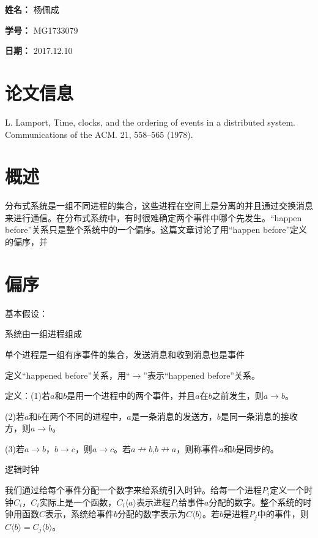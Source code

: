 \documentclass[UTF8]{article}
\begin{document}
    
{\flushleft \bf \Large 姓名：} 杨佩成

{\flushleft \bf \Large 学号：} MG1733079

{\flushleft \bf \Large 日期：} 2017.12.10


\section*{论文信息}
    
L. Lamport, Time, clocks, and the ordering of events in a distributed system. Communications of the ACM. 21, 558–565 (1978).


\section{概述}

	分布式系统是一组不同进程的集合，这些进程在空间上是分离的并且通过交换消息来进行通信。在分布式系统中，有时很难确定两个事件中哪个先发生。“happen before”关系只是整个系统中的一个偏序。这篇文章讨论了用“happen before”定义的偏序，并

\section{偏序}
  
	

	基本假设：
	
	系统由一组进程组成
	
	单个进程是一组有序事件的集合，发送消息和收到消息也是事件

	定义“happened before”关系，用“$\to$”表示“happened before”关系。

	定义：(1)若$a$和$b$是用一个进程中的两个事件，并且$a$在$b$之前发生，则$a \to b$。

		(2)若$a$和$b$在两个不同的进程中，$a$是一条消息的发送方，$b$是同一条消息的接收方，则$a \to b$。

		(3)若$a \to b$，$b \to c$，则$a \to c$。若$a \nrightarrow b$,$b \nrightarrow a$，则称事件$a$和$b$是同步的。

	逻辑时钟
	
	我们通过给每个事件分配一个数字来给系统引入时钟。给每一个进程$P_i$定义一个时钟$C_i$，$C_i$实际上是一个函数，$C_i \langle a \rangle$表示进程$P_i$给事件$a$分配的数字。整个系统的时钟用函数$C$表示，系统给事件$b$分配的数字表示为$C \langle b \rangle$。若$b$是进程$P_j$中的事件，则$C\langle b\rangle =C_j\langle b\rangle$。
	
\end{document}
